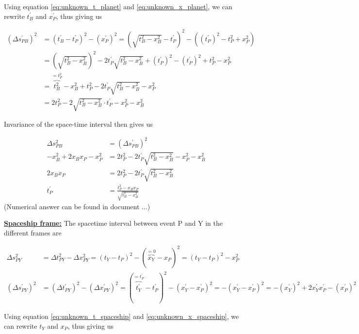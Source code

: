 \documentclass[a4paper,10pt,english]{article}
\begin{document}
\begin{enumerate}
\begin{enumerate}
Using equation \ref{eq:unknown_t_planet} and \ref{eq:unknown_x_planet}, we can rewrite $t^{\prime}_{B}$ and $x^{\prime}_{P}$, thus giving us 

\begin{align*}
(\Delta s_{PB}^{\prime})^2&=(t_{B}^{\prime}-t^{\prime}_{P})^2-(x^{\prime}_{P})^2=\left(\sqrt{t_{B}^2-x_{B}^2}-t^{\prime}_{P}\right)^2-\left((t^{\prime}_{P})^{2}-t_{P}^{2}+x_{P}^{2}\right)\\
&=\left(\sqrt{t_{B}^2-x_{B}^2}\right)^2-2t^{\prime}_{P}\sqrt{t_{B}^2-x_{B}^2}+(t^{\prime}_{P})^2-(t^{\prime}_{P})^{2}+t_{P}^{2}-x_{P}^{2}\\
&=\overbrace{t_{B}^2}^{=t_{P}^2}-x_{B}^2+t_{P}^{2}-2t^{\prime}_{P}\sqrt{t_{B}^2-x_{B}^2}-x_{P}^{2}\\
&=2t_{P}^{2}-2\sqrt{t_{B}^2-x_{B}^2}\cdot t^{\prime}_{P}-x_{P}^{2}-x_{B}^2
\end{align*}

Invariance of the space-time interval then gives us

\begin{align}
\Delta s_{PB}^2&=(\Delta s_{PB}^{\prime})^2 \nonumber\\
-x_{B}^2+2x_{B}x_{P}-x_{P}^2&=2t_{P}^{2}-2t^{\prime}_{P}\sqrt{t_{B}^2-x_{B}^2}-x_{P}^{2}-x_{B}^2 \nonumber\\
2x_{B}x_{P}&=2t_{P}^{2}-2t^{\prime}_{P}\sqrt{t_{B}^2-x_{B}^2} \nonumber\\
t^{\prime}_{P}&=\frac{t_{P}^{2}-x_{B}x_{P}}{\sqrt{t_{B}^2-x_{B}^2}} \label{eq:t_prime_p}
\end{align}
(Numerical answer can be found in document $\ldots$)

\underline{\bf{Spaceship frame:}} The spacetime interval between event P and Y in the different frames are

\begin{align*}
\Delta s_{PY}^2&=\Delta t_{PY}^2-\Delta x_{PY}^2=(t_{Y}-t_{P})^2-(\overbrace{x_{Y}}^{=0}-x_{P})^2=(t_{Y}-t_{P})^2-x_{P}^2\\
(\Delta s_{PY}^{\prime})^2&=(\Delta t_{PY}^{\prime})^2-(\Delta x_{PY}^{\prime})^2=(\overbrace{t_{Y}^{\prime}}^{=t^{\prime}_{P}}-t^{\prime}_{P})^2-(x_{Y}^{\prime}-x^{\prime}_{P})^2=-(x_{Y}^{\prime}-x^{\prime}_{P})^2=-(x_{Y}^{\prime})^2+2x_{Y}^{\prime}x^{\prime}_{P}-(x^{\prime}_{P})^2
\end{align*}

Using equation \ref{eq:unknown_t_spaceship} and \ref{eq:unknown_x_spaceship}, we can rewrite $t_{Y}$ and $x_{P}$, thus giving us 


\end{enumerate}
\end{enumerate}
\end{document}

